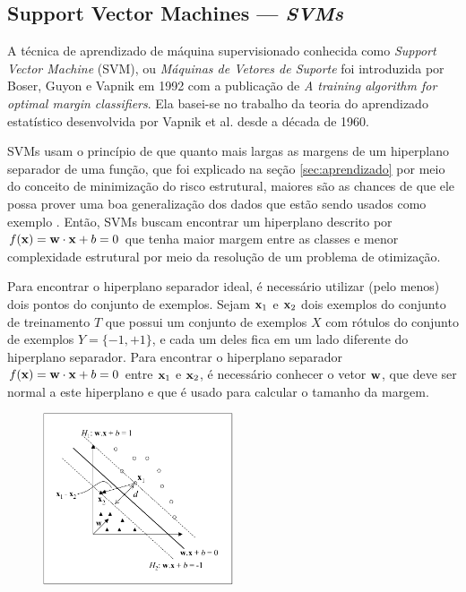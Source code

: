 
\subsection{Support Vector Machines --- \it{SVMs}}\label{sec:svm}
%

A técnica de aprendizado de máquina supervisionado conhecida como \emph{Support Vector Machine} (SVM), ou \emph{Máquinas de Vetores de Suporte} foi introduzida por Boser, Guyon e Vapnik em 1992 com a publica\c{c}ão de \emph{A training algorithm for optimal margin classifiers}\nocite{boser1992training}. Ela basei-se no trabalho da teoria do aprendizado estatístico desenvolvida por Vapnik et al. desde a década de 1960.

SVMs usam o princípio de que quanto mais largas as margens de um hiperplano separador de uma fun\c{c}ão, que foi explicado na se\c{c}ão \ref{sec:aprendizado} por meio do conceito de minimiza\c{c}ão do risco estrutural, maiores são as chances de que ele possa prover uma boa generaliza\c{c}ão dos dados que estão sendo usados como exemplo \cite{chapelle2002choosing}. Então, SVMs buscam encontrar um hiperplano descrito por $f(\mathbf{x}) = \mathbf{w}\cdot\mathbf{x} + b = 0$ que tenha maior margem entre as classes e menor complexidade estrutural por meio da resolu\c{c}ão de um problema de otimiza\c{c}ão.

Para encontrar o hiperplano separador ideal, é necessário utilizar (pelo menos) dois pontos do conjunto de exemplos. Sejam $\mathbf{x}_1$ e $\mathbf{x}_2$ dois exemplos do conjunto de treinamento $T$ que possui um conjunto de exemplos $X$ com rótulos do conjunto de exemplos $Y = \{-1, +1\}$, e cada um deles fica em um lado diferente do hiperplano separador. Para encontrar o hiperplano separador $f(\mathbf{x}) = \mathbf{w}\cdot\mathbf{x} + b = 0$ entre $\mathbf{x}_1$ e $\mathbf{x}_2$, é necessário conhecer o vetor $\mathbf{w}$, que deve ser normal a este hiperplano e que é usado para calcular o tamanho da margem.

\begin{figure}[h!]
  \centering
  \includegraphics[width=0.5\textwidth]{img/fig-hiperplanos.png}
  \label{fig:hiperplanos}
\end{figure}

